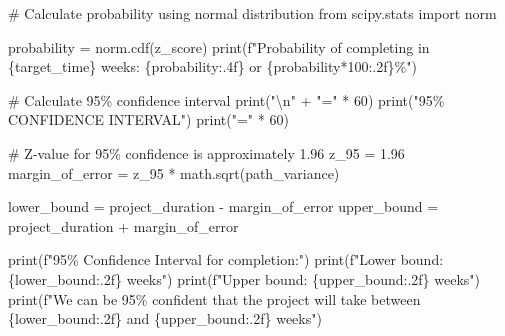 \documentclass[
  letterpaper,
  DIV=11,
  numbers=noendperiod]{scrreprt}
\newenvironment{Shaded}{\begin{snugshade}}{\end{snugshade}}
\newcommand{\BuiltInTok}[1]{\textcolor[rgb]{0.00,0.23,0.31}{#1}}
\newcommand{\CharTok}[1]{\textcolor[rgb]{0.13,0.47,0.30}{#1}}
\newcommand{\CommentTok}[1]{\textcolor[rgb]{0.37,0.37,0.37}{#1}}
\newcommand{\DecValTok}[1]{\textcolor[rgb]{0.68,0.00,0.00}{#1}}
\newcommand{\FloatTok}[1]{\textcolor[rgb]{0.68,0.00,0.00}{#1}}
\newcommand{\ImportTok}[1]{\textcolor[rgb]{0.00,0.46,0.62}{#1}}
\newcommand{\NormalTok}[1]{\textcolor[rgb]{0.00,0.23,0.31}{#1}}
\newcommand{\OperatorTok}[1]{\textcolor[rgb]{0.37,0.37,0.37}{#1}}
\newcommand{\SpecialCharTok}[1]{\textcolor[rgb]{0.37,0.37,0.37}{#1}}
\newcommand{\SpecialStringTok}[1]{\textcolor[rgb]{0.13,0.47,0.30}{#1}}
\newcommand{\StringTok}[1]{\textcolor[rgb]{0.13,0.47,0.30}{#1}}
\begin{document}
\begin{Shaded}
\begin{Highlighting}[]
    \CommentTok{\# Calculate probability using normal distribution}
    \ImportTok{from}\NormalTok{ scipy.stats }\ImportTok{import}\NormalTok{ norm}
    
\NormalTok{    probability }\OperatorTok{=}\NormalTok{ norm.cdf(z\_score)}
    \BuiltInTok{print}\NormalTok{(}\SpecialStringTok{f"Probability of completing in }\SpecialCharTok{\{}\NormalTok{target\_time}\SpecialCharTok{\}}\SpecialStringTok{ weeks: }\SpecialCharTok{\{}\NormalTok{probability}\SpecialCharTok{:.4f\}}\SpecialStringTok{ or }\SpecialCharTok{\{}\NormalTok{probability}\OperatorTok{*}\DecValTok{100}\SpecialCharTok{:.2f\}}\SpecialStringTok{\%"}\NormalTok{)}
    
    \CommentTok{\# Calculate 95\% confidence interval}
    \BuiltInTok{print}\NormalTok{(}\StringTok{"}\CharTok{\textbackslash{}n}\StringTok{"} \OperatorTok{+} \StringTok{"="} \OperatorTok{*} \DecValTok{60}\NormalTok{)}
    \BuiltInTok{print}\NormalTok{(}\StringTok{"95\% CONFIDENCE INTERVAL"}\NormalTok{)}
    \BuiltInTok{print}\NormalTok{(}\StringTok{"="} \OperatorTok{*} \DecValTok{60}\NormalTok{)}
    
    \CommentTok{\# Z{-}value for 95\% confidence is approximately 1.96}
\NormalTok{    z\_95 }\OperatorTok{=} \FloatTok{1.96}
\NormalTok{    margin\_of\_error }\OperatorTok{=}\NormalTok{ z\_95 }\OperatorTok{*}\NormalTok{ math.sqrt(path\_variance)}
    
\NormalTok{    lower\_bound }\OperatorTok{=}\NormalTok{ project\_duration }\OperatorTok{{-}}\NormalTok{ margin\_of\_error}
\NormalTok{    upper\_bound }\OperatorTok{=}\NormalTok{ project\_duration }\OperatorTok{+}\NormalTok{ margin\_of\_error}
    
    \BuiltInTok{print}\NormalTok{(}\SpecialStringTok{f"95\% Confidence Interval for completion:"}\NormalTok{)}
    \BuiltInTok{print}\NormalTok{(}\SpecialStringTok{f"Lower bound: }\SpecialCharTok{\{}\NormalTok{lower\_bound}\SpecialCharTok{:.2f\}}\SpecialStringTok{ weeks"}\NormalTok{)}
    \BuiltInTok{print}\NormalTok{(}\SpecialStringTok{f"Upper bound: }\SpecialCharTok{\{}\NormalTok{upper\_bound}\SpecialCharTok{:.2f\}}\SpecialStringTok{ weeks"}\NormalTok{)}
    \BuiltInTok{print}\NormalTok{(}\SpecialStringTok{f"We can be 95\% confident that the project will take between }\SpecialCharTok{\{}\NormalTok{lower\_bound}\SpecialCharTok{:.2f\}}\SpecialStringTok{ and }\SpecialCharTok{\{}\NormalTok{upper\_bound}\SpecialCharTok{:.2f\}}\SpecialStringTok{ weeks"}\NormalTok{)}
    

\end{Highlighting}
\end{Shaded}
\end{document}
